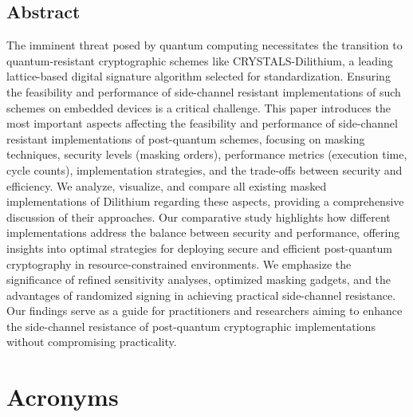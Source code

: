 \documentclass[a4paper,12pt,oneside,openany,headsepline,bibliography=totocnumbered]{scrbook}
\begin{document}


\section*{Abstract}
\thispagestyle{abstract}

The imminent threat posed by quantum computing necessitates the transition to quantum-resistant cryptographic schemes like CRYSTALS-Dilithium, a leading lattice-based digital signature algorithm selected for standardization. Ensuring the feasibility and performance of side-channel resistant implementations of such schemes on embedded devices is a critical challenge. This paper introduces the most important aspects affecting the feasibility and performance of side-channel resistant implementations of post-quantum schemes, focusing on masking techniques, security levels (masking orders), performance metrics (execution time, cycle counts), implementation strategies, and the trade-offs between security and efficiency. We analyze, visualize, and compare all existing masked implementations of Dilithium regarding these aspects, providing a comprehensive discussion of their approaches. Our comparative study highlights how different implementations address the balance between security and performance, offering insights into optimal strategies for deploying secure and efficient post-quantum cryptography in resource-constrained environments. We emphasize the significance of refined sensitivity analyses, optimized masking gadgets, and the advantages of randomized signing in achieving practical side-channel resistance. Our findings serve as a guide for practitioners and researchers aiming to enhance the side-channel resistance of post-quantum cryptographic implementations without compromising practicality.


\tableofcontents
\thispagestyle{contents}

\chapter*{Acronyms}
\thispagestyle{acronyms}
\begin{acronym}[PQC]
\end{acronym}








\newpage
\listoffigures
\thispagestyle{listsoffigures}

\listoftables
\thispagestyle{listoftables}

\newpage


\thispagestyle{bibliography}
\end{document}
